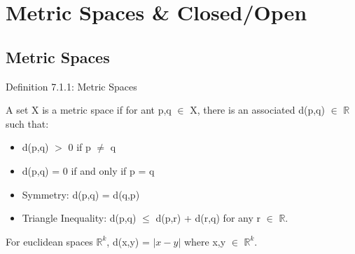 \newpage

\section[Day 7: Metric Spaces and Closed/Open]{ Metric Spaces \& Closed/Open }

\subsection{ Metric Spaces }

{ \color{blue} Definition 7.1.1: Metric Spaces } 

	\begin{adjustbox}{minipage=14cm, right, vspace=0.1cm 0cm}
		A set X is a metric space if for ant p,q $\in$ X, there is an associated d(p,q) $\in$
		$\mathbb{R}$ such that:	
		\begin{itemize}[leftmargin=1cm, itemsep=0.1cm]
			\item d(p,q) $>$ 0 \qquad \qquad if p $\neq$ q
			
			\item d(p,q) = 0 if and only if p = q
			
			\item {\color{lblue} Symmetry}:
				d(p,q) = d(q,p)
			
			\item {\color{lblue} Triangle Inequality}:
				d(p,q) $\leq$ d(p,r) + d(r,q) \qquad \qquad for any r $\in$ $\mathbb{R}$.
		\end{itemize}

		For euclidean spaces $\mathbb{R}^k$, d(x,y) = $| x - y |$ where x,y $\in$ $\mathbb{R}^k$. \\
	\end{adjustbox}

